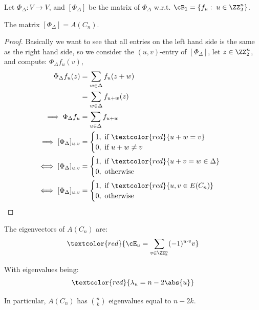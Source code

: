 Let \( \Phi_\Delta : V \to V \), and \( [\Phi_\Delta] \) be the matrix of \( \Phi_\Delta \) w.r.t. \( \cB_1 = \{f_u: \; u\in \ZZ^n_2\} \).

\begin{lemma}
	The matrix \( [\Phi_\Delta] = A(C_n) \).
\end{lemma}

\begin{proof}
	Basically we want to see that all entries on the left hand side is the same as the right hand side, so we consider the \((u,v)\)-entry of \( [\Phi_\Delta] \), let \( z\in \ZZ^n_2 \), and compute: \( \Phi_\Delta f_u(v) \),
	\[
		\begin{aligned}
			\Phi_\Delta f_u(z)           & = \sum_{w\in \Delta}f_u(z+w)                        \\
			                             & = \sum_{w\in \Delta}f_{u+w}(z)                      \\
			\implies \Phi_\Delta f_u     & = \sum_{u\in\Delta} f_{u+w}                         \\
			\implies [\Phi_\Delta]_{u,v} & = \begin{cases}
				                                 1, \text{ if } \textcolor{red}{u+w = v} \\
				                                 0, \text{ if } u+w \ne v
			                                 \end{cases}           \\
			\iff [\Phi_\Delta]_{u,v}     & = \begin{cases}
				                                 1, \text{ if } \textcolor{red}{u+v = w\in \Delta} \\
				                                 0, \text{ otherwise}
			                                 \end{cases} \\
			\iff [\Phi_\Delta]_{u,v}     & = \begin{cases}
				                                 1, \text{ if } \textcolor{red}{u,v \in E(C_n)} \\
				                                 0, \text{ otherwise}
			                                 \end{cases}
		\end{aligned}
	\]
\end{proof}

\begin{corollary}
	The eigenvectors of \( A(C_n) \) are:
	\[
		\textcolor{red}{\cE_u = \sum_{v\in \ZZ^n_2} (-1)^{u\cdot v}v}
	\]

	With eigenvalues being:
	\[
		\textcolor{red}{\lambda_u = n - 2\abs{u}}
	\]

	In particular, \( A(C_n) \) has \( \binom{n}{k} \) eigenvalues equal to \( n-2k \).
\end{corollary}

